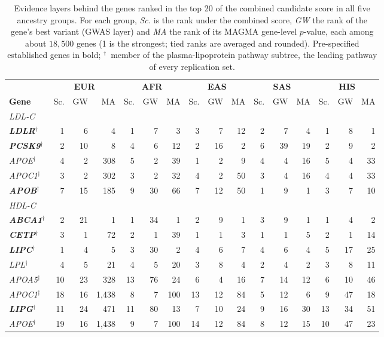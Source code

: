\begin{table}[!htbp]
\centering
\caption{Evidence layers behind the genes ranked in the top 20 of the combined candidate score in all five ancestry groups. For each group, \emph{Sc.} is the rank under the combined score, \emph{GW} the rank of the gene's best variant (GWAS layer) and \emph{MA} the rank of its MAGMA gene-level $p$-value, each among about $18{,}500$ genes (1 is the strongest; tied ranks are averaged and rounded). Pre-specified established genes in bold; $^\dagger$~member of the plasma-lipoprotein pathway subtree, the leading pathway of every replication set.}
\label{tab:replication_genes}
\footnotesize
\setlength{\tabcolsep}{3.5pt}
\begin{tabular*}{\linewidth}{@{\extracolsep{\fill}}lrrrrrrrrrrrrrrr}
\toprule
 & \multicolumn{3}{c}{\textbf{EUR}} & \multicolumn{3}{c}{\textbf{AFR}} & \multicolumn{3}{c}{\textbf{EAS}} & \multicolumn{3}{c}{\textbf{SAS}} & \multicolumn{3}{c}{\textbf{HIS}} \\
\cmidrule(lr){2-4}\cmidrule(lr){5-7}\cmidrule(lr){8-10}\cmidrule(lr){11-13}\cmidrule(lr){14-16}
\textbf{Gene} & Sc. & GW & MA & Sc. & GW & MA & Sc. & GW & MA & Sc. & GW & MA & Sc. & GW & MA \\
\midrule
\multicolumn{16}{l}{\textit{LDL-C}} \\
\textbf{\textit{LDLR}}$^\dagger$ & 1 & 6 & 4 & 1 & 7 & 3 & 3 & 7 & 12 & 2 & 7 & 4 & 1 & 8 & 1 \\
\textbf{\textit{PCSK9}}$^\dagger$ & 2 & 10 & 8 & 4 & 6 & 12 & 2 & 16 & 2 & 6 & 39 & 19 & 2 & 9 & 2 \\
\textit{APOE}$^\dagger$ & 4 & 2 & 308 & 5 & 2 & 39 & 1 & 2 & 9 & 4 & 4 & 16 & 5 & 4 & 33 \\
\textit{APOC1}$^\dagger$ & 3 & 2 & 302 & 3 & 2 & 32 & 4 & 2 & 50 & 3 & 4 & 16 & 4 & 4 & 33 \\
\textbf{\textit{APOB}}$^\dagger$ & 7 & 15 & 185 & 9 & 30 & 66 & 7 & 12 & 50 & 1 & 9 & 1 & 3 & 7 & 10 \\
\multicolumn{16}{l}{\textit{HDL-C}} \\
\textbf{\textit{ABCA1}}$^\dagger$ & 2 & 21 & 1 & 1 & 34 & 1 & 2 & 9 & 1 & 3 & 9 & 1 & 1 & 4 & 2 \\
\textbf{\textit{CETP}}$^\dagger$ & 3 & 1 & 72 & 2 & 1 & 39 & 1 & 1 & 3 & 1 & 1 & 5 & 2 & 1 & 14 \\
\textbf{\textit{LIPC}}$^\dagger$ & 1 & 4 & 5 & 3 & 30 & 2 & 4 & 6 & 7 & 4 & 6 & 4 & 5 & 17 & 25 \\
\textit{LPL}$^\dagger$ & 4 & 5 & 21 & 4 & 5 & 20 & 3 & 8 & 4 & 2 & 4 & 2 & 3 & 8 & 11 \\
\textit{APOA5}$^\dagger$ & 10 & 23 & 328 & 13 & 76 & 24 & 6 & 4 & 16 & 7 & 14 & 12 & 6 & 10 & 46 \\
\textit{APOC1}$^\dagger$ & 18 & 16 & 1{,}438 & 8 & 7 & 100 & 13 & 12 & 84 & 5 & 12 & 6 & 9 & 47 & 18 \\
\textbf{\textit{LIPG}}$^\dagger$ & 11 & 24 & 471 & 11 & 80 & 13 & 7 & 10 & 24 & 9 & 16 & 30 & 13 & 34 & 51 \\
\textit{APOE}$^\dagger$ & 19 & 16 & 1{,}438 & 9 & 7 & 100 & 14 & 12 & 84 & 8 & 12 & 15 & 10 & 47 & 23 \\
\bottomrule
\end{tabular*}
\end{table}
